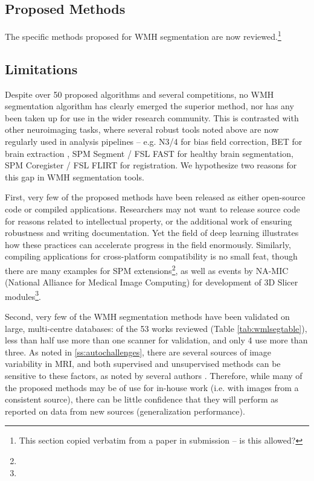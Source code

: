 \subsection{Proposed Methods}
The specific methods proposed for WMH segmentation are now reviewed.\footnote{This section copied verbatim from a paper in submission \cite{Knight2017a} -- is this allowed?}
\newcommand{\priorworksub}[1]{\subsubsection{#1}}

\subsection{Limitations}\label{ss:priorlimits}
Despite over 50 proposed algorithms and several competitions, no WMH segmentation algorithm has clearly emerged the superior method, nor has any been taken up for use in the wider research community. This is contrasted with other neuroimaging tasks, where several robust tools noted above are now regularly used in analysis pipelines -- e.g. N3/4 \cite{Tustison2010} for bias field correction, BET for brain extraction \cite{Smith2002a}, SPM Segment \cite{Ashburner2005} / FSL FAST \cite{Zhang2001} for healthy brain segmentation, SPM Coregister \cite{Ashburner2005} / FSL FLIRT \cite{Jenkinson2001} for registration. We hypothesize two reasons for this gap in WMH segmentation tools.
\par
First, very few of the proposed methods have been released as either open-source code or compiled applications. Researchers may not want to release source code for reasons related to intellectual property, or the additional work of ensuring robustness and writing documentation. Yet the field of deep learning illustrates how these practices can accelerate progress in the field enormously. Similarly, compiling applications for cross-platform compatibility is no small feat, though there are many examples for SPM extensions\footnote{}, as well as events by NA-MIC (National Alliance for Medical Image Computing) for development of 3D Slicer modules\footnote{}.
\par
Second, very few of the WMH segmentation methods have been validated on large, multi-centre databases: of the 53 works reviewed (Table \ref{tab:wmlsegtable}), less than half use more than one scanner for validation, and only 4 use more than three. As noted in \ref{ss:autochallenges}, there are several sources of image variability in MRI, and both supervised and unsupervised methods can be sensitive to these factors, as noted by several authors \cite{Llado2012,Sweeney2013,Dadar2017}. Therefore, while many of the proposed methods may be of use for in-house work (i.e. with images from a consistent source), there can be little confidence that they will perform as reported on data from new sources (generalization performance).
